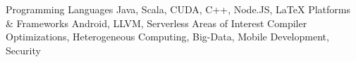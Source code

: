 \begin{cvskills}
    \cvskill
    {Programming Languages}
    {Java, Scala, CUDA, C++, Node.JS, LaTeX}
    \cvskill
    {Platforms \& Frameworks}
    {Android, LLVM, Serverless}
    \cvskill
    {Areas of Interest}
    {Compiler Optimizations, Heterogeneous Computing, Big-Data, Mobile Development, Security}

\end{cvskills}
